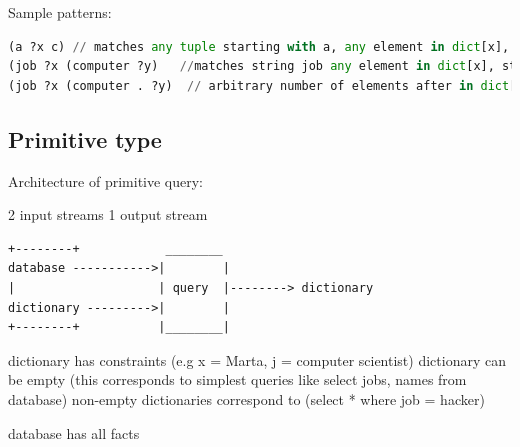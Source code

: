 \documentclass[a4paper,twoside]{article}
\numberwithin{equation}{section}
\begin{document}
Sample patterns:
\begin{lstlisting}[language=Python]
(a ?x c) // matches any tuple starting with a, any element in dict[x], ending in c
(job ?x (computer ?y)   //matches string job any element in dict[x], string computer, one element in dict[y]
(job ?x (computer . ?y)  // arbitrary number of elements after in dict[y]
\end{lstlisting}

\subsection{Primitive type}
Architecture of primitive query:

2 input streams                           1 output stream
\begin{lstlisting}
+--------+            ________
database ----------->|        |
|                    | query  |--------> dictionary
dictionary --------->|        |
+--------+           |________|
\end{lstlisting}

dictionary has constraints (e.g x = Marta, j = computer scientist)
dictionary can be empty (this corresponds to simplest queries like select jobs, names from database)
non-empty dictionaries correspond to (select * where job = hacker)

database has all facts
\end{document}
